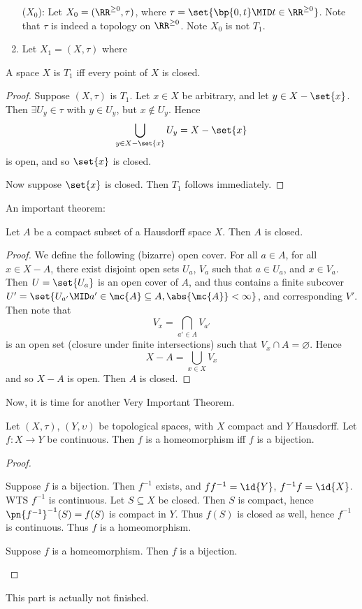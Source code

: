 \documentclass{fkbook}
\theoremstyle{snazzydefinition}
\begin{document}
\begin{adjustwidth}{1em}{1em}
\begin{enumerate}[label=($X_\arabic*)$:]
    \item[($X_0$):] Let $X_0 = (\RR^{\geq 0}, \tau)$, where $\tau =
      \set{\bp{0,t} \MID t \in \RR^{\geq 0}}$. Note that $\tau$ is
      indeed a topology on $\RR^{\geq 0}$. Note $X_0$ is not $T_1$.
    \item Let $X_1 = (X, \tau)$ where
  \end{enumerate}
  \begin{theorem}
    A space $X$ is $T_1$ iff every point of $X$ is closed.
  \end{theorem}
  \begin{proof}
    Suppose $(X, \tau)$ is $T_1$. Let $x \in X$ be arbitrary, and let
    $y \in X- \set{x}$. Then $\exists U_y \in \tau$ with $y \in U_y$,
    but $x \not \in U_y$. Hence
    \[
      \bigcup_{y \in X - \set{x}} U_y = X - \set{x}
    \]
    is open, and so $\set{x}$ is closed.

    Now suppose $\set{x}$ is closed. Then $T_1$ follows immediately.
  \end{proof}
  An important theorem:
  \begin{theorem}
    Let $A$ be a compact subset of a Hausdorff space $X$. Then $A$ is
    closed.
  \end{theorem}
  \begin{proof}
    We define the following (bizarre) open cover. For all $a \in A$,
    for all $x \in X - A$, there exist disjoint open sets $U_a$, $V_a$
    such that $a \in U_a$, and $x \in V_a$. Then $U = \set{U_a}$ is an
    open cover of $A$, and thus contains a finite subcover $U' =
    \set{U_{a'} \MID a' \in \mc{A} \subseteq A, \abs{\mc{A}} <
      \infty}$, and corresponding $V'$. Then note that
    \[
      V_x = \bigcap_{a' \in A} V_{a'}
    \]
    is an open set (closure under finite intersections) such that $V_x
    \cap A = \varnothing$. Hence
    \[
      X - A = \bigcup_{x \in X} V_x
    \]
    and so $X - A$ is open. Then $A$ is closed.
  \end{proof}
  Now, it is time for another Very Important Theorem\texttrademark.
  \begin{theorem}
    Let $(X, \tau)$, $(Y, \upsilon)$ be topological spaces, with $X$
    compact and $Y$ Hausdorff. Let $f : X \to Y$ be continuous. Then
    $f$ is a homeomorphism iff $f$ is a bijection.
  \end{theorem}
  \begin{proof}~
    \begin{iffproof}
      \item Suppose $f$ is a bijection. Then $f^{-1}$ exists, and
        $ff^{-1} = \id{Y}$, $f^{-1}f = \id{X}$. WTS $f^{-1}$ is
        continuous. Let $S \subseteq X$ be closed. Then $S$ is
        compact, hence $\pn{f^{-1}}^{-1}(S) = f(S)$ is compact in $Y$.
        Thus $f(S)$ is closed as well, hence $f^{-1}$ is continuous.
        Thus $f$ is a homeomorphism.
      \item Suppose $f$ is a homeomorphism. Then $f$ is a bijection.
    \end{iffproof}
  \end{proof}
  This part is actually not finished.

\end{adjustwidth}
\end{document}
